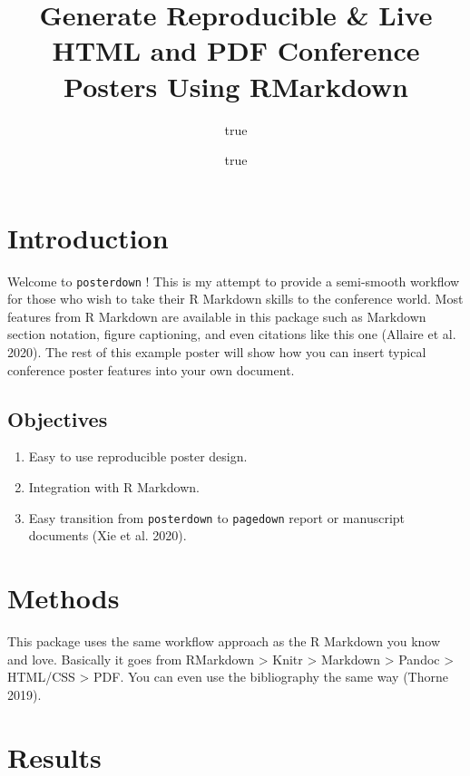 \documentclass[]{article}
\title{Generate Reproducible \& Live HTML and PDF Conference Posters Using
RMarkdown}
\author{true \and true}
\date{}
\providecommand{\tightlist}{%
  \setlength{\itemsep}{0pt}\setlength{\parskip}{0pt}}
\begin{document}
\maketitle

\hypertarget{introduction}{%
\section{Introduction}\label{introduction}}

Welcome to \texttt{posterdown} ! This is my attempt to provide a
semi-smooth workflow for those who wish to take their R Markdown skills
to the conference world. Most features from R Markdown are available in
this package such as Markdown section notation, figure captioning, and
even citations like this one (Allaire et al. 2020). The rest of this
example poster will show how you can insert typical conference poster
features into your own document.

\hypertarget{objectives}{%
\subsection{Objectives}\label{objectives}}

\begin{enumerate}
\def\labelenumi{\arabic{enumi}.}
\tightlist
\item
  Easy to use reproducible poster design.
\item
  Integration with R Markdown.
\item
  Easy transition from \texttt{posterdown} to \texttt{pagedown} report
  or manuscript documents (Xie et al. 2020).
\end{enumerate}

\hypertarget{methods}{%
\section{Methods}\label{methods}}

This package uses the same workflow approach as the R Markdown you know
and love. Basically it goes from RMarkdown \textgreater{} Knitr
\textgreater{} Markdown \textgreater{} Pandoc \textgreater{} HTML/CSS
\textgreater{} PDF. You can even use the bibliography the same way
(Thorne 2019).

\hypertarget{results}{%
\section{Results}\label{results}}
\end{document}
